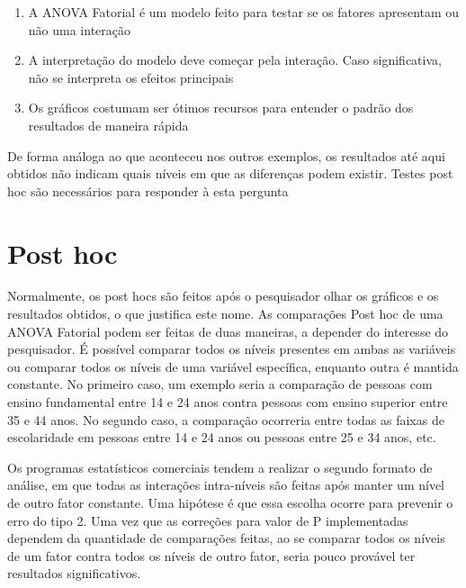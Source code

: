 \documentclass[
]{book}
\providecommand{\tightlist}{%
  \setlength{\itemsep}{0pt}\setlength{\parskip}{0pt}}
\begin{document}
\begin{explore}

\begin{enumerate}
\def\labelenumi{\arabic{enumi}.}
\tightlist
\item
  A ANOVA Fatorial é um modelo feito para testar se os fatores apresentam ou não uma interação\\
\item
  A interpretação do modelo deve começar pela interação. Caso significativa, não se interpreta os efeitos principais\\
\item
  Os gráficos costumam ser ótimos recursos para entender o padrão dos resultados de maneira rápida\\
\end{enumerate}

\end{explore}

De forma análoga ao que aconteceu nos outros exemplos, os resultados até aqui obtidos não indicam quais níveis em que as diferenças podem existir. Testes post hoc são necessários para responder à esta pergunta

\hypertarget{post-hoc-2}{%
\section{Post hoc}\label{post-hoc-2}}

Normalmente, os post hocs são feitos após o pesquisador olhar os gráficos e os resultados obtidos, o que justifica este nome. As comparações Post hoc de uma ANOVA Fatorial podem ser feitas de duas maneiras, a depender do interesse do pesquisador. É possível comparar todos os níveis presentes em ambas as variáveis ou comparar todos os níveis de uma variável específica, enquanto outra é mantida constante. No primeiro caso, um exemplo seria a comparação de pessoas com ensino fundamental entre 14 e 24 anos contra pessoas com ensino superior entre 35 e 44 anos. No segundo caso, a comparação ocorreria entre todas as faixas de escolaridade em pessoas entre 14 e 24 anos ou pessoas entre 25 e 34 anos, etc.

Os programas estatísticos comerciais tendem a realizar o segundo formato de análise, em que todas as interações intra-níveis são feitas após manter um nível de outro fator constante. Uma hipótese é que essa escolha ocorre para prevenir o erro do tipo 2. Uma vez que as correções para valor de P implementadas dependem da quantidade de comparações feitas, ao se comparar todos os níveis de um fator contra todos os níveis de outro fator, seria pouco provável ter resultados significativos.
\end{document}

